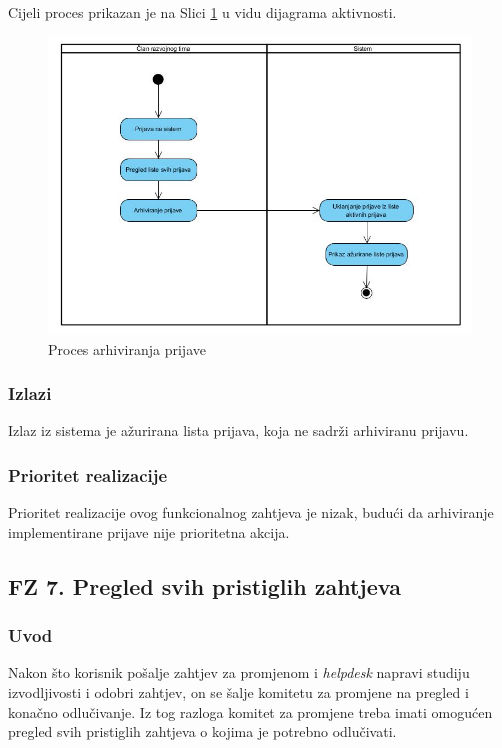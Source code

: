 \documentclass[12pt,a4paper]{article}
\begin{document}
Cijeli proces prikazan je na Slici \ref{act6} u vidu dijagrama aktivnosti.

\begin{figure}[H]
\center
\includegraphics[scale=0.5]{../res/Activity/activity6.JPG}
\caption{Proces arhiviranja prijave}
\label{act6}
\end{figure}

\subsubsection{Izlazi}

Izlaz iz sistema je ažurirana lista prijava, koja ne sadrži arhiviranu prijavu.

\subsubsection{Prioritet realizacije}

Prioritet realizacije ovog funkcionalnog zahtjeva je nizak, budući da arhiviranje implementirane prijave nije prioritetna akcija.

\subsection{FZ 7. Pregled svih pristiglih zahtjeva}

\subsubsection{Uvod}

Nakon što korisnik pošalje zahtjev za promjenom i \textit{helpdesk} napravi studiju izvodljivosti i odobri zahtjev, on se šalje komitetu za promjene na pregled i konačno odlučivanje. Iz tog razloga komitet za promjene treba imati omogućen pregled svih pristiglih zahtjeva o kojima je potrebno odlučivati.
\end{document}
